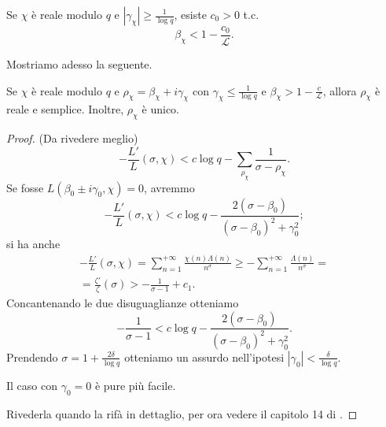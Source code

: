 \begin{prop}
  Se $\chi$ è reale modulo $q$ e $|\gamma_\chi| \ge \frac{1}{\log{q}}$, esiste $c_0>0$ t.c.
  $$\beta_\chi<1-\frac{c_0}{\mathcal{L}}.$$
\end{prop}

Mostriamo adesso la seguente.

\begin{prop}
  Se $\chi$ è reale modulo $q$ e $\rho_\chi=\beta_\chi+i\gamma_\chi$ con $\gamma_\chi \le \frac{1}{\log{q}}$ e $\beta_\chi>1-\frac{c}{\mathcal{L}}$, allora $\rho_\chi$ è reale e semplice. Inoltre, $\rho_\chi$ è unico.
\end{prop}

\begin{proof}
  (Da rivedere meglio)
  $$-\frac{L'}{L}(\sigma,\chi)<c\log{q}-\sum_{\rho_\chi} \frac{1}{\sigma-\rho_\chi}.$$
  Se fosse $L(\beta_0\pm i\gamma_0,\chi)=0$, avremmo
  $$-\frac{L'}{L}(\sigma,\chi)<c\log{q}-\frac{2(\sigma-\beta_0)}{(\sigma-\beta_0)^2+\gamma_0^2};$$
  si ha anche
  \begin{gather*}
    -\frac{L'}{L}(\sigma,\chi)=\sum_{n=1}^{+\infty} \frac{\chi(n)\Lambda(n)}{n^{\sigma}} \ge -\sum_{n=1}^{+\infty} \frac{\Lambda(n)}{n^{\sigma}}= \\
    =\frac{\zeta'}{\zeta}(\sigma)>-\frac{1}{\sigma-1}+c_1.
  \end{gather*}
  Concantenando le due disuguaglianze otteniamo
  $$-\frac{1}{\sigma-1}<c\log{q}-\frac{2(\sigma-\beta_0)}{(\sigma-\beta_0)^2+\gamma_0^2}.$$
  Prendendo $\sigma=1+\frac{2\delta}{\log{q}}$ otteniamo un assurdo nell'ipotesi $|\gamma_0|<\frac{\delta}{\log{q}}$.

  Il caso con $\gamma_0=0$ è pure più facile.

  Rivederla quando la rifà in dettaglio, per ora vedere il capitolo 14 di \cite{D}.
\end{proof}
